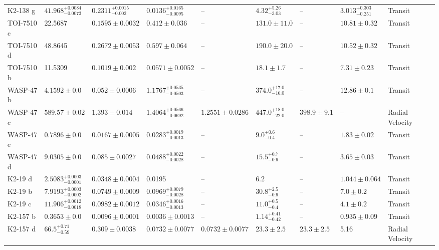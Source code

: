 \begin{tabular}{llllllllll}
K2-138 g & $41.968^{+0.0084}_{-0.0073}$ & $0.2311^{+0.0015}_{-0.002}$ & $0.0136^{+0.0165}_{-0.0095}$ & -- & $4.32^{+5.26}_{-3.03}$ & -- & $3.013^{+0.303}_{-0.251}$ & Transit & \cite{LOPEZ_ET_AL__2019} \\
TOI-7510 c & 22.5687 & $0.1595 \pm 0.0032$ & $0.412 \pm 0.036$ & -- & $131.0 \pm 11.0$ & -- & $10.81 \pm 0.32$ & Transit & \cite{ALMENARA_ET_AL_2025} \\
TOI-7510 d & 48.8645 & $0.2672 \pm 0.0053$ & $0.597 \pm 0.064$ & -- & $190.0 \pm 20.0$ & -- & $10.52 \pm 0.32$ & Transit & \cite{ALMENARA_ET_AL_2025} \\
TOI-7510 b & 11.5309 & $0.1019 \pm 0.002$ & $0.0571 \pm 0.0052$ & -- & $18.1 \pm 1.7$ & -- & $7.31 \pm 0.23$ & Transit & \cite{ALMENARA_ET_AL_2025} \\
WASP-47 b & $4.1592 \pm 0.0$ & $0.052 \pm 0.0006$ & $1.1767^{+0.0535}_{-0.0503}$ & -- & $374.0^{+17.0}_{-16.0}$ & -- & $12.86 \pm 0.1$ & Transit & \cite{NASCIMBENI_ET_AL__2023} \\
WASP-47 c & $589.57 \pm 0.02$ & $1.393 \pm 0.014$ & $1.4064^{+0.0566}_{-0.0692}$ & $1.2551 \pm 0.0286$ & $447.0^{+18.0}_{-22.0}$ & $398.9 \pm 9.1$ & -- & Radial Velocity & \cite{NASCIMBENI_ET_AL__2023} \\
WASP-47 e & $0.7896 \pm 0.0$ & $0.0167 \pm 0.0005$ & $0.0283^{+0.0019}_{-0.0013}$ & -- & $9.0^{+0.6}_{-0.4}$ & -- & $1.83 \pm 0.02$ & Transit & \cite{NASCIMBENI_ET_AL__2023} \\
WASP-47 d & $9.0305 \pm 0.0$ & $0.085 \pm 0.0027$ & $0.0488^{+0.0022}_{-0.0028}$ & -- & $15.5^{+0.7}_{-0.9}$ & -- & $3.65 \pm 0.03$ & Transit & \cite{NASCIMBENI_ET_AL__2023} \\
K2-19 d & $2.5083^{+0.0003}_{-0.0001}$ & $0.0348 \pm 0.0004$ & 0.0195 & -- & 6.2 & -- & $1.044 \pm 0.064$ & Transit & \cite{ALMENARA_ET_AL_2025} \\
K2-19 b & $7.9193^{+0.0003}_{-0.0002}$ & $0.0749 \pm 0.0009$ & $0.0969^{+0.0079}_{-0.0028}$ & -- & $30.8^{+2.5}_{-0.9}$ & -- & $7.0 \pm 0.2$ & Transit & \cite{ENTRICAN_ET_AL_2026} \\
K2-19 c & $11.906^{+0.0012}_{-0.0018}$ & $0.0982 \pm 0.0012$ & $0.0346^{+0.0016}_{-0.0013}$ & -- & $11.0^{+0.5}_{-0.4}$ & -- & $4.1 \pm 0.2$ & Transit & \cite{ENTRICAN_ET_AL_2026} \\
K2-157 b & $0.3653 \pm 0.0$ & $0.0096 \pm 0.0001$ & $0.0036 \pm 0.0013$ & -- & $1.14^{+0.41}_{-0.42}$ & -- & $0.935 \pm 0.09$ & Transit & \cite{CASTRO_GONZALEZ_ET_AL_2025} \\
K2-157 d & $66.5^{+0.71}_{-0.59}$ & $0.309 \pm 0.0038$ & $0.0732 \pm 0.0077$ & $0.0732 \pm 0.0077$ & $23.3 \pm 2.5$ & $23.3 \pm 2.5$ & 5.16 & Radial Velocity & \cite{CASTRO_GONZALEZ_ET_AL_2025} \\

\end{tabular}
